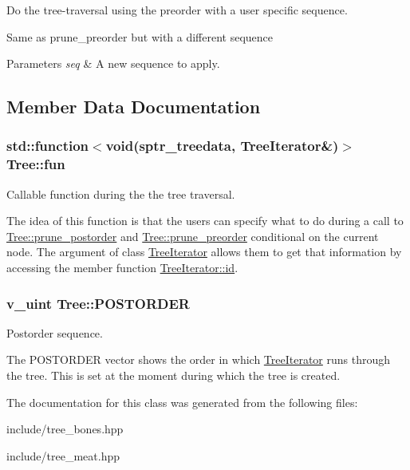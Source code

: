 Do the tree-\/traversal using the preorder with a user specific sequence. 

Same as {\ttfamily prune\+\_\+preorder} but with a different sequence 
\begin{DoxyParams}{Parameters}
{\em seq} & A new sequence to apply. \\
\hline
\end{DoxyParams}


\subsection{Member Data Documentation}
\subsubsection[{\texorpdfstring{fun}{fun}}]{\setlength{\rightskip}{0pt plus 5cm}std\+::function$<$void(sptr\+\_\+treedata, {\bf Tree\+Iterator}\&)$>$ Tree\+::fun}\hypertarget{classTree_ad98f51efc931f96c687c65d4387d19e9}{}\label{classTree_ad98f51efc931f96c687c65d4387d19e9}


Callable function during the the tree traversal. 

The idea of this function is that the users can specify what to do during a call to \hyperlink{classTree_a7d465880d18acf79f3a772ea5412b0d7}{Tree\+::prune\+\_\+postorder} and \hyperlink{classTree_ac85bfb083b3856e65987e1d15885a61c}{Tree\+::prune\+\_\+preorder} conditional on the current node. The argument of class \hyperlink{classTreeIterator}{Tree\+Iterator} allows them to get that information by accessing the member function \hyperlink{classTreeIterator_a80badcbb276e0aa78216f5ef6ff91b62}{Tree\+Iterator\+::id}. 
\subsubsection[{\texorpdfstring{P\+O\+S\+T\+O\+R\+D\+ER}{POSTORDER}}]{\setlength{\rightskip}{0pt plus 5cm}v\+\_\+uint Tree\+::\+P\+O\+S\+T\+O\+R\+D\+ER\hspace{0.3cm}{\ttfamily [protected]}}\hypertarget{classTree_a310e76b803db38e7067514822b21a58f}{}\label{classTree_a310e76b803db38e7067514822b21a58f}


Postorder sequence. 

The P\+O\+S\+T\+O\+R\+D\+ER vector shows the order in which \hyperlink{classTreeIterator}{Tree\+Iterator} runs through the tree. This is set at the moment during which the tree is created. 

The documentation for this class was generated from the following files\+:\begin{DoxyCompactItemize}
\item 
include/tree\+\_\+bones.\+hpp\item 
include/tree\+\_\+meat.\+hpp\end{DoxyCompactItemize}
